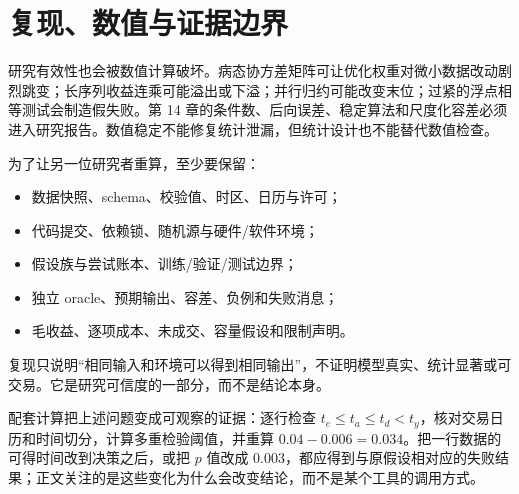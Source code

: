 \section{复现、数值与证据边界}

研究有效性也会被数值计算破坏。病态协方差矩阵可让优化权重对微小数据改动剧烈跳变；长序列收益连乘可能溢出或下溢；并行归约可能改变末位；过紧的浮点相等测试会制造假失败。第 14 章的条件数、后向误差、稳定算法和尺度化容差必须进入研究报告。数值稳定不能修复统计泄漏，但统计设计也不能替代数值检查。

为了让另一位研究者重算，至少要保留：
\begin{itemize}[leftmargin=*]
  \item 数据快照、schema、校验值、时区、日历与许可；
  \item 代码提交、依赖锁、随机源与硬件/软件环境；
  \item 假设族与尝试账本、训练/验证/测试边界；
  \item 独立 oracle、预期输出、容差、负例和失败消息；
  \item 毛收益、逐项成本、未成交、容量假设和限制声明。
\end{itemize}
复现只说明“相同输入和环境可以得到相同输出”，不证明模型真实、统计显著或可交易。它是研究可信度的一部分，而不是结论本身。


配套计算把上述问题变成可观察的证据：逐行检查
$t_e\le t_a\le t_d<t_y$，核对交易日历和时间切分，计算多重检验阈值，并重算 $0.04-0.006=0.034$。把一行数据的可得时间改到决策之后，或把 $p$ 值改成 $0.003$，都应得到与原假设相对应的失败结果；正文关注的是这些变化为什么会改变结论，而不是某个工具的调用方式。

